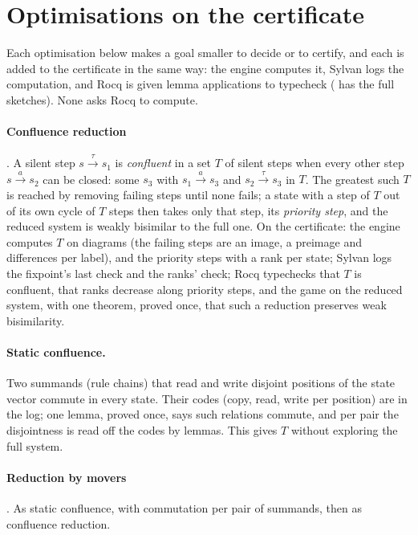 \section{Optimisations on the certificate}\label{sec:optimisations}

Each optimisation below makes a goal smaller to decide or to certify, and
each is added to the certificate in the same way: the engine computes it,
Sylvan logs the computation, and Rocq is given lemma applications to
typecheck ( has the full sketches). None asks
Rocq to compute.

\paragraph{Confluence reduction} \citep{groote-vdpol00}. A silent step
$s \xrightarrow{\tau} s_1$ is \emph{confluent} in a set $T$ of silent steps
when every other step $s \xrightarrow{a} s_2$ can be closed: some $s_3$
with $s_1 \xrightarrow{a} s_3$ and $s_2 \xrightarrow{\tau} s_3$ in $T$. The
greatest such $T$ is reached by removing failing steps until none fails; a
state with a step of $T$ out of its own cycle of $T$ steps then takes only
that step, its \emph{priority step}, and the reduced system is weakly
bisimilar to the full one. On the certificate: the engine computes $T$ on
diagrams (the failing steps are an image, a preimage and differences per
label), and the priority steps with a rank per state; Sylvan logs the
fixpoint's last check and the ranks' check; Rocq typechecks that $T$ is
confluent, that ranks decrease along priority steps, and the game on the
reduced system, with one theorem, proved once, that such a reduction
preserves weak bisimilarity.

\paragraph{Static confluence.} Two summands (rule chains) that read and
write disjoint positions of the state vector commute in every state. Their
codes (copy, read, write per position) are in the log; one lemma, proved
once, says such relations commute, and per pair the disjointness is read
off the codes by lemmas. This gives $T$ without exploring the full system.

\paragraph{Reduction by movers} \citep{lipton75}. As static confluence,
with commutation per pair of summands, then as confluence reduction.

